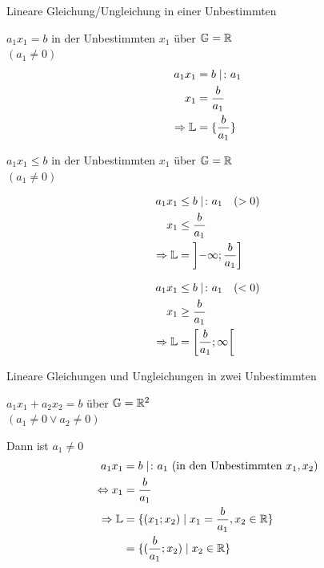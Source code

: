 \clearpage
\begin{enumerate}[A)]
	{\bf\item Lineare Gleichung/Ungleichung in einer Unbestimmten}
	
	 $a_1x_1 = b$ in der Unbestimmten $x_1$ über $\mathbb{G}=\mathbb{R}$\\
	$(a_1\ne0)$
	\begin{align*}
	a_1x_1 &= b \mid \colon a_1\\
	x_1 &= \dfrac{b}{a_1}\\
	\Rightarrow \mathbb{L} &= \{\dfrac{b}{a_1}\}
	\end{align*}
	
	\clearpage
	 $a_1x_1 \le b$ in der Unbestimmten $x_1$ über $\mathbb{G}=\mathbb{R}$\\
	$(a_1\ne0)$
	
	\begin{align*}
	a_1x_1 &\le b \mid \colon a_1\quad(>0)\\
	x_1 &\le \dfrac{b}{a_1}\\
	\Rightarrow \mathbb{L} &= \left]-\infty; \dfrac{b}{a_1}\right]
	\end{align*}
	
	\begin{align*}
	a_1x_1 &\le b \mid \colon a_1\quad(<0)\\
	x_1 &\ge \dfrac{b}{a_1}\\
	\Rightarrow \mathbb{L} &= \left[\dfrac{b}{a_1}; \infty\right[
	\end{align*}
	
	\clearpage
	{\bf\item Lineare Gleichungen und Ungleichungen in zwei Unbestimmten}
	
	 $a_1x_1 + a_2x_2 = b$ über $\mathbb{G}=\mathbb{R}^2$\\
	$(a_1\ne0 \lor a_2\ne0)$
	
	 Dann ist $a_1\ne0$
	\begin{align*}
	a_1x_1 &= b \mid \colon a_1\text{ (in den Unbestimmten }x_1,x_2)\\
	\Leftrightarrow x_1 &= \dfrac{b}{a_1}\\
	\Rightarrow \mathbb{L} &= \{(x_1;x_2)\mid x_1=\dfrac{b}{a_1},x_2\in\mathbb{R}\}\\
	&= \{(\dfrac{b}{a_1};x_2)\mid x_2\in\mathbb{R}\}
	\end{align*}
	

\end{enumerate}
